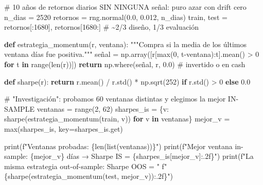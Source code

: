 \documentclass[
  spanish,
  letterpaper,
  DIV=11,
  numbers=noendperiod]{scrreprt}
\newenvironment{Shaded}{\begin{snugshade}}{\end{snugshade}}
\newcommand{\BuiltInTok}[1]{\textcolor[rgb]{0.00,0.23,0.31}{#1}}
\newcommand{\CommentTok}[1]{\textcolor[rgb]{0.37,0.37,0.37}{#1}}
\newcommand{\ControlFlowTok}[1]{\textcolor[rgb]{0.00,0.23,0.31}{\textbf{#1}}}
\newcommand{\DecValTok}[1]{\textcolor[rgb]{0.68,0.00,0.00}{#1}}
\newcommand{\FloatTok}[1]{\textcolor[rgb]{0.68,0.00,0.00}{#1}}
\newcommand{\KeywordTok}[1]{\textcolor[rgb]{0.00,0.23,0.31}{\textbf{#1}}}
\newcommand{\NormalTok}[1]{\textcolor[rgb]{0.00,0.23,0.31}{#1}}
\newcommand{\OperatorTok}[1]{\textcolor[rgb]{0.37,0.37,0.37}{#1}}
\newcommand{\SpecialCharTok}[1]{\textcolor[rgb]{0.37,0.37,0.37}{#1}}
\newcommand{\SpecialStringTok}[1]{\textcolor[rgb]{0.13,0.47,0.30}{#1}}
\begin{document}
\label{data-snooping}
\begin{Shaded}
\begin{Highlighting}[]
\CommentTok{\# 10 años de retornos diarios SIN NINGUNA señal: puro azar con drift cero}
\NormalTok{n\_dias }\OperatorTok{=} \DecValTok{2520}
\NormalTok{retornos }\OperatorTok{=}\NormalTok{ rng.normal(}\FloatTok{0.0}\NormalTok{, }\FloatTok{0.012}\NormalTok{, n\_dias)}
\NormalTok{train, test }\OperatorTok{=}\NormalTok{ retornos[:}\DecValTok{1680}\NormalTok{], retornos[}\DecValTok{1680}\NormalTok{:]   }\CommentTok{\# \textasciitilde{}2/3 diseño, 1/3 evaluación}

\KeywordTok{def}\NormalTok{ estrategia\_momentum(r, ventana):}
    \CommentTok{"""Compra si la media de los últimos \textasciigrave{}ventana\textasciigrave{} días fue positiva."""}
\NormalTok{    señal }\OperatorTok{=}\NormalTok{ np.array([r[}\BuiltInTok{max}\NormalTok{(}\DecValTok{0}\NormalTok{, t}\OperatorTok{{-}}\NormalTok{ventana):t].mean() }\OperatorTok{\textgreater{}} \DecValTok{0} \ControlFlowTok{for}\NormalTok{ t }\KeywordTok{in} \BuiltInTok{range}\NormalTok{(}\BuiltInTok{len}\NormalTok{(r))])}
    \ControlFlowTok{return}\NormalTok{ np.where(señal, r, }\FloatTok{0.0}\NormalTok{)   }\CommentTok{\# invertido o en cash}

\KeywordTok{def}\NormalTok{ sharpe(r):}
    \ControlFlowTok{return}\NormalTok{ r.mean() }\OperatorTok{/}\NormalTok{ r.std() }\OperatorTok{*}\NormalTok{ np.sqrt(}\DecValTok{252}\NormalTok{) }\ControlFlowTok{if}\NormalTok{ r.std() }\OperatorTok{\textgreater{}} \DecValTok{0} \ControlFlowTok{else} \FloatTok{0.0}

\CommentTok{\# "Investigación": probamos 60 ventanas distintas y elegimos la mejor IN{-}SAMPLE}
\NormalTok{ventanas }\OperatorTok{=} \BuiltInTok{range}\NormalTok{(}\DecValTok{2}\NormalTok{, }\DecValTok{62}\NormalTok{)}
\NormalTok{sharpes\_is }\OperatorTok{=}\NormalTok{ \{v: sharpe(estrategia\_momentum(train, v)) }\ControlFlowTok{for}\NormalTok{ v }\KeywordTok{in}\NormalTok{ ventanas\}}
\NormalTok{mejor\_v }\OperatorTok{=} \BuiltInTok{max}\NormalTok{(sharpes\_is, key}\OperatorTok{=}\NormalTok{sharpes\_is.get)}

\BuiltInTok{print}\NormalTok{(}\SpecialStringTok{f"Ventanas probadas: }\SpecialCharTok{\{}\BuiltInTok{len}\NormalTok{(}\BuiltInTok{list}\NormalTok{(ventanas))}\SpecialCharTok{\}}\SpecialStringTok{"}\NormalTok{)}
\BuiltInTok{print}\NormalTok{(}\SpecialStringTok{f"Mejor ventana in{-}sample: }\SpecialCharTok{\{}\NormalTok{mejor\_v}\SpecialCharTok{\}}\SpecialStringTok{ días → Sharpe IS = }\SpecialCharTok{\{}\NormalTok{sharpes\_is[mejor\_v]}\SpecialCharTok{:.2f\}}\SpecialStringTok{"}\NormalTok{)}
\BuiltInTok{print}\NormalTok{(}\SpecialStringTok{f"La misma estrategia out{-}of{-}sample:   Sharpe OOS = "}
      \SpecialStringTok{f"}\SpecialCharTok{\{}\NormalTok{sharpe(estrategia\_momentum(test, mejor\_v))}\SpecialCharTok{:.2f\}}\SpecialStringTok{"}\NormalTok{)}
\end{Highlighting}
\end{Shaded}
\end{document}

